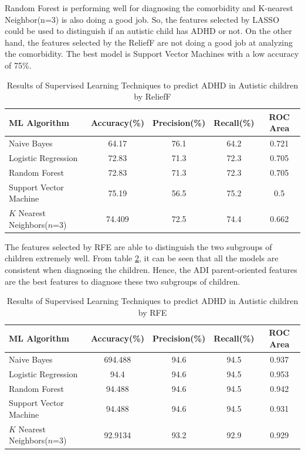 Random Forest is performing well for diagnosing the comorbidity and K-nearest Neighbor(n=3) is also doing a good job. So, the features selected by LASSO could be used to distinguish if an autistic child has ADHD or not. On the other hand, the features selected by the ReliefF are not doing a good job at analyzing the comorbidity. The best model is Support Vector Machines with a low accuracy of 75\%.
\begin{table}[h]
\begin{center}
\begin{tabular}{|l|c|c|c|c|}
\hline
\textbf{ML Algorithm} & \textbf{Accuracy(\%)}&	\textbf{Precision(\%)}&	\textbf{Recall(\%)}&	\textbf{ROC Area}\\
\hline \hline
Naive Bayes	&64.17&	76.1&	64.2&	0.721\\
\hline
Logistic Regression&	72.83&	71.3&	72.3&	0.705\\
\hline
Random Forest&	72.83&	71.3&	72.3&	0.705\\
\hline
Support Vector Machine&	75.19&	56.5&	75.2&	0.5\\
\hline
$K$ Nearest Neighbors($n$=3)&	74.409&	72.5&	74.4	&0.662\\
\hline
\end{tabular}
\end{center}
\caption{Results of Supervised Learning Techniques to predict ADHD in Autistic children by ReliefF}
\label{table:53}
\end{table}

The features selected by RFE are able to distinguish the two subgroups of children extremely well. From table \ref{table:54}, it can be seen that all the models are consistent when diagnosing the children. Hence, the ADI parent-oriented features are the best features to diagnose these two subgroups of children.
\begin{table}[h]
\begin{center}
\begin{tabular}{|l|c|c|c|c|}
\hline
\textbf{ML Algorithm} & \textbf{Accuracy(\%)}&	\textbf{Precision(\%)}&	\textbf{Recall(\%)}&	\textbf{ROC Area}\\
\hline \hline
Naive Bayes	&694.488	&94.6	&94.5	&0.937\\
\hline
Logistic Regression&94.4 &	94.6&	94.5&	0.953\\
\hline
Random Forest&94.488 &	94.6 &	94.5 &	0.942\\
\hline
Support Vector Machine&	94.488 &	94.6	&94.5 &	0.931\\
\hline
$K$ Nearest Neighbors($n$=3)&92.9134 &	93.2 &	92.9 &	0.929\\
\hline
\end{tabular}
\end{center}
\caption{Results of Supervised Learning Techniques to predict ADHD in Autistic children by RFE}
\label{table:54}
\end{table}

